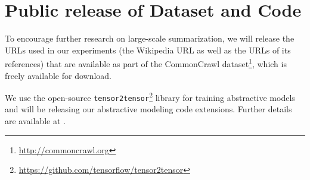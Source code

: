 \section{Public release of Dataset and Code}
To encourage further research on large-scale summarization,
we will release the URLs used in our experiments
(the Wikipedia URL as well as the URLs of its references)
that are available as part of the CommonCrawl dataset\footnote{\url{http://commoncrawl.org}},
which is freely available for download.

We use the open-source \texttt{tensor2tensor}\footnote{\url{https://github.com/tensorflow/tensor2tensor}}
library for
training abstractive models and will be releasing our abstractive
modeling code extensions.
Further details are available at \coderepo.


